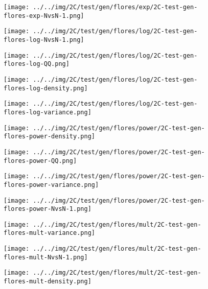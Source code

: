 \begin{figure}[H]
\centering	\texttt{[image: ../../img/2C/test/gen/flores/exp/2C-test-gen-flores-exp-NvsN-1.png]}
\end{figure}
\begin{figure}[H]
\centering	\texttt{[image: ../../img/2C/test/gen/flores/log/2C-test-gen-flores-log-NvsN-1.png]}
\end{figure}
\begin{figure}[H]
\centering	\texttt{[image: ../../img/2C/test/gen/flores/log/2C-test-gen-flores-log-QQ.png]}
\end{figure}
\begin{figure}[H]
\centering	\texttt{[image: ../../img/2C/test/gen/flores/log/2C-test-gen-flores-log-density.png]}
\end{figure}
\begin{figure}[H]
\centering	\texttt{[image: ../../img/2C/test/gen/flores/log/2C-test-gen-flores-log-variance.png]}
\end{figure}
\begin{figure}[H]
\centering	\texttt{[image: ../../img/2C/test/gen/flores/power/2C-test-gen-flores-power-density.png]}
\end{figure}
\begin{figure}[H]
\centering	\texttt{[image: ../../img/2C/test/gen/flores/power/2C-test-gen-flores-power-QQ.png]}
\end{figure}
\begin{figure}[H]
\centering	\texttt{[image: ../../img/2C/test/gen/flores/power/2C-test-gen-flores-power-variance.png]}
\end{figure}
\begin{figure}[H]
\centering	\texttt{[image: ../../img/2C/test/gen/flores/power/2C-test-gen-flores-power-NvsN-1.png]}
\end{figure}
\begin{figure}[H]
\centering	\texttt{[image: ../../img/2C/test/gen/flores/mult/2C-test-gen-flores-mult-variance.png]}
\end{figure}
\begin{figure}[H]
\centering	\texttt{[image: ../../img/2C/test/gen/flores/mult/2C-test-gen-flores-mult-NvsN-1.png]}
\end{figure}
\begin{figure}[H]
\centering	\texttt{[image: ../../img/2C/test/gen/flores/mult/2C-test-gen-flores-mult-density.png]}
\end{figure}
